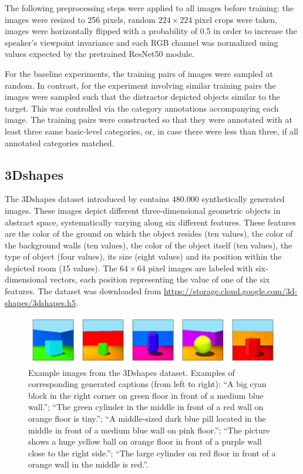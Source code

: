 The following preprocessing steps were applied to all images before training: the images were resized to 256 pixels, random $224\times224$ pixel crops were taken, images were horizontally flipped with a probability of 0.5 in order to increase the speaker's viewpoint invariance and each RGB channel was normalized using values expected by the pretrained ResNet50 module.

For the baseline experiments, the training pairs of images were sampled at random. In contrast, for the experiment involving similar training pairs the images were sampled such that the distractor depicted objects similar to the target. This was controlled via the category annotations accompanying each image. The training pairs were constructed so that they were annotated with at least three same basic-level categories, or, in case there were less than three, if all annotated categories matched.

\subsection{3Dshapes}
\label{ds:3dshapes}
The 3Dshapes dataset introduced by \textcite{burgess20183d} contains 480.000 synthetically generated images. These images depict different three-dimensional geometric objects in abstract space, systematically varying along six different features. These features are the color of the ground on which the object resides (ten values), the color of the background walls (ten values), the color of the object itself (ten values), the type of object (four values), its size (eight values) and its position within the depicted room (15 values). %
The $64\times64$ pixel images are labeled with six-dimensional vectors, each position representing the value of one of the six features.
The dataset was downloaded from \url{https://storage.cloud.google.com/3d-shapes/3dshapes.h5}.
\begin{figure}
\centering
\includegraphics[width=\linewidth]{images/3dshapes_example.png}
\caption{Example images from the 3Dshapes dataset. Examples of corresponding generated captions (from left to right): ``A big cyan block in the right corner on green floor in front of a medium blue wall.''; ``The green cylinder in the middle in front of a red wall on orange floor is tiny.''; ``A middle-sized dark blue pill located in the middle in front of a medium blue wall on pink floor.''; ``The picture shows a huge yellow ball on orange floor in front of a purple wall close to the right side.''; ``The large cylinder on red floor in front of a orange wall in the middle is red.''.}
\label{fig:3dshapes_example}
\end{figure}  

